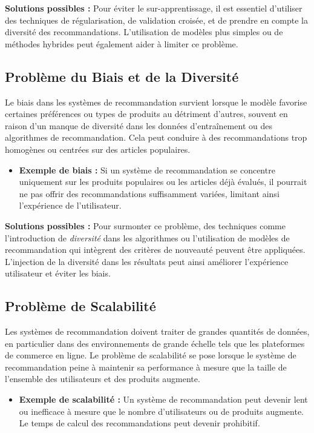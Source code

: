 \textbf{Solutions possibles :} Pour éviter le sur-apprentissage, il est essentiel d’utiliser des techniques de régularisation, de validation croisée, et de prendre en compte la diversité des recommandations. L’utilisation de modèles plus simples ou de méthodes hybrides peut également aider à limiter ce problème.

\subsection{Problème du Biais et de la Diversité}

Le biais dans les systèmes de recommandation survient lorsque le modèle favorise certaines préférences ou types de produits au détriment d'autres, souvent en raison d'un manque de diversité dans les données d'entraînement ou des algorithmes de recommandation. Cela peut conduire à des recommandations trop homogènes ou centrées sur des articles populaires.

\begin{itemize}
    \item \textbf{Exemple de biais :} Si un système de recommandation se concentre uniquement sur les produits populaires ou les articles déjà évalués, il pourrait ne pas offrir des recommandations suffisamment variées, limitant ainsi l’expérience de l’utilisateur.
\end{itemize}

\textbf{Solutions possibles :} Pour surmonter ce problème, des techniques comme l’introduction de \textit{diversité} dans les algorithmes ou l’utilisation de modèles de recommandation qui intègrent des critères de nouveauté peuvent être appliquées. L'injection de la diversité dans les résultats peut ainsi améliorer l’expérience utilisateur et éviter les biais.

\subsection{Problème de Scalabilité}

Les systèmes de recommandation doivent traiter de grandes quantités de données, en particulier dans des environnements de grande échelle tels que les plateformes de commerce en ligne. Le problème de scalabilité se pose lorsque le système de recommandation peine à maintenir sa performance à mesure que la taille de l’ensemble des utilisateurs et des produits augmente.

\begin{itemize}
    \item \textbf{Exemple de scalabilité :} Un système de recommandation peut devenir lent ou inefficace à mesure que le nombre d’utilisateurs ou de produits augmente. Le temps de calcul des recommandations peut devenir prohibitif.
\end{itemize}

